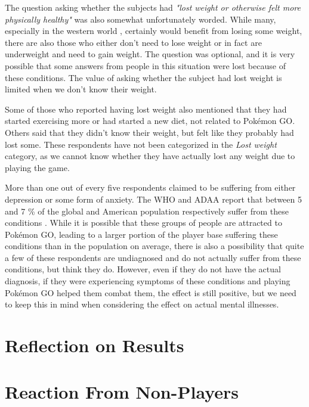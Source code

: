 The question asking whether the subjects had \emph{"lost weight or otherwise felt more physically healthy"} was also somewhat unfortunately worded. While many, especially in the western world , certainly would benefit from losing some weight, there are also those who either don't need to lose weight or in fact are underweight and need to gain weight. The question was optional, and it is very possible that some answers from people in this situation were lost because of these conditions. The value of asking whether the subject had lost weight is limited when we don't know their weight.

Some of those who reported having lost weight also mentioned that they had started exercising more or had started a new diet, not related to Pokémon GO. Others said that they didn't know their weight, but felt like they probably had lost some. These respondents have not been categorized in the \emph{Lost weight} category, as we cannot know whether they have actually lost any weight due to playing the game. 

More than one out of every five respondents claimed to be suffering from either depression or some form of anxiety. The WHO and ADAA report that between 5 and 7 \% of the global and American population respectively suffer from these conditions . While it is possible that these groups of people are attracted to Pokémon GO, leading to a larger portion of the player base suffering these conditions than in the population on average, there is also a possibility that quite a few of these respondents are undiagnosed and do not actually suffer from these conditions, but think they do. However, even if they do not have the actual diagnosis, if they were experiencing symptoms of these conditions and playing Pokémon GO helped them combat them, the effect is still positive, but we need to keep this in mind when considering the effect on actual mental illnesses.

\section{Reflection on Results}


\section{Reaction From Non-Players}

